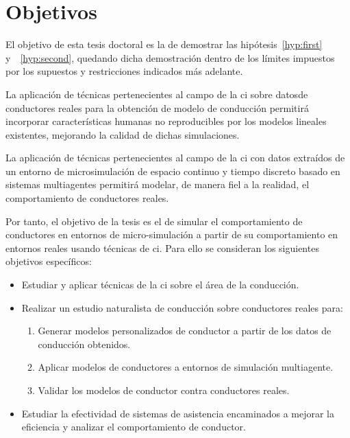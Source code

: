 \section{Objetivos}
\label{ch:intro:objectives}

El objetivo de esta tesis doctoral es la de demostrar las hipótesis~\ref{hyp:first} y~~\ref{hyp:second}, quedando dicha demostración dentro de los límites impuestos por los supuestos y restricciones indicados más adelante.

\begin{hyp} \label{hyp:first}
	La aplicación de técnicas pertenecientes al campo de la \ac{ci} sobre datosde conductores reales para la obtención de modelo de conducción permitirá incorporar características humanas no reproducibles por los modelos lineales existentes, mejorando la calidad de dichas simulaciones.
\end{hyp}

\begin{hyp} \label{hyp:second}
	La aplicación de técnicas pertenecientes al campo de la \ac{ci} con datos extraídos de un entorno de microsimulación de espacio continuo y tiempo discreto basado en sistemas multiagentes permitirá modelar, de manera fiel a la realidad, el comportamiento de conductores reales.
\end{hyp}

Por tanto, el objetivo de la tesis es el de simular el comportamiento de conductores en entornos de micro-simulación a partir de su comportamiento en entornos reales usando técnicas de \ac{ci}. Para ello se consideran los siguientes objetivos específicos:

\begin{itemize}
	\item Estudiar y aplicar técnicas de la \ac{ci} sobre el área de la conducción.
	\item Realizar un estudio naturalista de conducción sobre conductores reales para:
	\begin{enumerate}
		\item Generar modelos personalizados de conductor a partir de los datos de conducción obtenidos.
		\item Aplicar modelos de conductores a entornos de simulación multiagente.
		\item Validar los modelos de conductor contra conductores reales.
	\end{enumerate}
	\item Estudiar la efectividad de sistemas de asistencia encaminados a mejorar la eficiencia y analizar el comportamiento de conductor.
\end{itemize}

